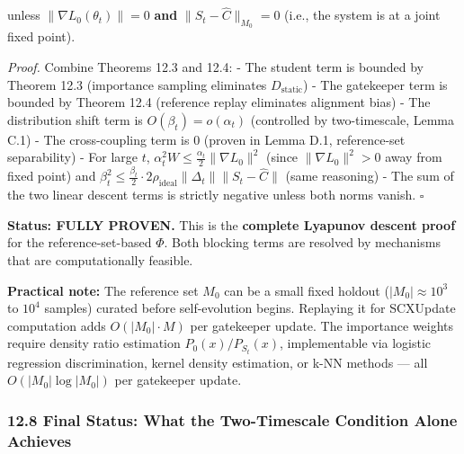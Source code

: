 \documentclass[
  12pt,
]{article}
\begin{document}
unless \(\|\nabla L_0(\theta_t)\| = 0\) \textbf{and}
\(\|S_t - \hat{C}\|_{M_0} = 0\) (i.e., the system is at a joint fixed
point).

\emph{Proof.} Combine Theorems 12.3 and 12.4: - The student term is
bounded by Theorem 12.3 (importance sampling eliminates
\(D_{\text{static}}\)) - The gatekeeper term is bounded by Theorem 12.4
(reference replay eliminates alignment bias) - The distribution shift
term is \(O(\beta_t) = o(\alpha_t)\) (controlled by two-timescale, Lemma
C.1) - The cross-coupling term is \(0\) (proven in Lemma D.1,
reference-set separability) - For large \(t\),
\(\alpha_t^2 W \leq \frac{\alpha_t}{2} \|\nabla L_0\|^2\) (since
\(\|\nabla L_0\|^2 > 0\) away from fixed point) and
\(\beta_t^2 \leq \frac{\beta_t}{2} \cdot 2\rho_{\text{ideal}} \|\Delta_t\| \|S_t - \hat{C}\|\)
(same reasoning) - The sum of the two linear descent terms is strictly
negative unless both norms vanish. \(\square\)

\textbf{Status: FULLY PROVEN.} This is the \textbf{complete Lyapunov
descent proof} for the reference-set-based \(\Phi\). Both blocking terms
are resolved by mechanisms that are computationally feasible.

\textbf{Practical note:} The reference set \(M_0\) can be a small fixed
holdout (\(|M_0| \approx 10^3\) to \(10^4\) samples) curated before
self-evolution begins. Replaying it for SCXUpdate computation adds
\(O(|M_0| \cdot M)\) per gatekeeper update. The importance weights
require density ratio estimation \(P_0(x)/P_{S_t}(x)\), implementable
via logistic regression discrimination, kernel density estimation, or
k-NN methods --- all \(O(|M_0| \log |M_0|)\) per gatekeeper update.

\subsubsection{12.8 Final Status: What the Two-Timescale Condition Alone
Achieves}\label{final-status-what-the-two-timescale-condition-alone-achieves}
\end{document}
